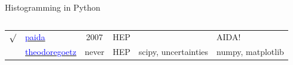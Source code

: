 \documentclass[aspectratio=169]{beamer}
\begin{document}
\begin{frame}{Histogramming in Python}
\begin{columns}
\begin{tabular}{c l c p{2.7 cm} p{1.5 cm} p{4.75 cm}}
$\surd$ & \href{https://pypi.org/project/paida}{\textcolor{blue}{paida}} & 2007 & HEP & & AIDA! \\
& \href{https://github.com/theodoregoetz/histogram}{\textcolor{blue}{theodoregoetz}} & never & HEP & scipy, \mbox{uncertainties} & numpy, matplotlib \\
\end{tabular}
\end{columns}
\end{frame}
\end{document}
